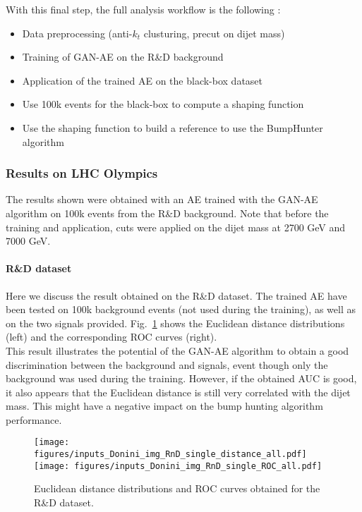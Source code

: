 \documentclass[a4paper,11pt]{article}
\begin{document}
\noindent With this final step, the full analysis workflow is the following :
\begin{itemize}
	\item Data preprocessing (anti-$k_t$ clusturing, precut on dijet mass)
	\item Training of GAN-AE on the R\&D background
	\item Application of the trained AE on the black-box dataset
	\item Use 100k events for the black-box to compute a shaping function
	\item Use the shaping function to build a reference to use the BumpHunter algorithm
\end{itemize}



\subsubsection{Results on LHC Olympics}
\label{sec:results}

\noindent The results shown were obtained with an AE trained with the GAN-AE algorithm on 100k events from the R\&D background.
Note that before the training and application, cuts were applied on the dijet mass at 2700 GeV and 7000 GeV.


\paragraph{R\&D dataset}
\label{sec:RnD}

\noindent Here we discuss the result obtained on the R\&D dataset.
The trained AE have been tested on 100k background events (not used during the training), as well as on the two signals provided.
Fig.~\ref{fig:GAE_RnD} shows the Euclidean distance distributions (left) and the corresponding ROC curves (right).\\

\noindent This result illustrates the potential of the GAN-AE algorithm to obtain a good discrimination between the background and signals, event though only the background was used during the training.
However, if the obtained AUC is good, it also appears that the Euclidean distance is still very correlated with the dijet mass.
This might have a negative impact on the bump hunting algorithm performance.

\begin{figure}[h!]
\centering
\texttt{[image: figures/inputs\_Donini\_img\_RnD\_single\_distance\_all.pdf]}
\texttt{[image: figures/inputs\_Donini\_img\_RnD\_single\_ROC\_all.pdf]}
\caption{Euclidean distance distributions and ROC curves obtained for the R\&D dataset.}
\label{fig:GAE_RnD}
\end{figure}
\end{document}
